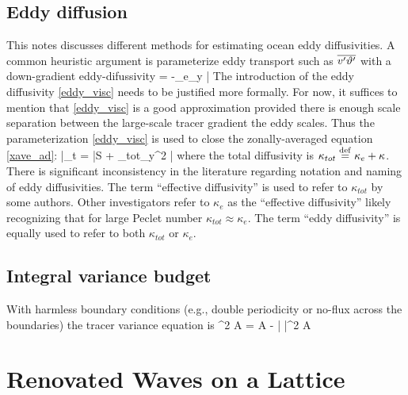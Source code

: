 \documentclass[11pt]{article}
\newcommand{\So}{\mathcal{S}}
\newcommand{\bvth}{\bar{\vth}}
\newcommand{\kappat}{\kappa_{tot}}
\newcommand{\kappae}{\kappa_{e}}
\begin{document}
\subsection{Eddy diffusion}
This notes discusses different methods for estimating ocean eddy diffusivities. A common heuristic argument is parameterize eddy transport such as $\overline{v'\vartheta'}$ with a down-gradient
 eddy-difussivity
\beq
\label{eddy_visc}
 = -\kappae \p_y \bvth\per
\eeq
The introduction of the eddy diffusivity \eqref{eddy_visc} needs to be justified more formally. For now, it suffices to mention that  \eqref{eddy_visc} is a good approximation provided there is enough scale separation between the large-scale tracer gradient the eddy scales. Thus the parameterization \eqref{eddy_visc}  is used to close the zonally-averaged equation \eqref{xave_ad}:
\beq
\label{xave_ad_2}
\bvth_t   = \bar{S} + \kappat \p_y^2 \bvth\com
\eeq
where the total diffusivity is $\kappat \defn \kappae + \kappa$. There is significant inconsistency in the literature regarding 
notation and naming of eddy diffusivities.  The term ``effective diffusivity''  is used to refer to $\kappat$ by some authors. Other investigators refer to $\kappae$ as the ``effective diffusivity'' likely recognizing that for large Peclet number $\kappat \approx \kappae$. The term ``eddy diffusivity'' is equally used to refer to both $\kappat$ or $\kappae$.

\subsection{Integral variance budget}
With harmless boundary conditions (e.g., double periodicity or no-flux across the boundaries) the tracer variance
equation is
\beq
\label{varvth}
  \int \half \vth^2 \dd A = \int \vth \So \dd A - \kappa \int | \nabla \vth |^2 \dd A\per
\eeq
       



\section{Renovated Waves on a Lattice}
\end{document}
